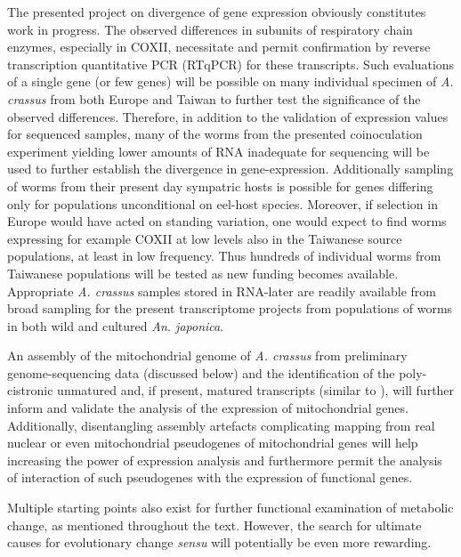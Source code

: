 The presented project on divergence of gene expression obviously
constitutes work in progress. The observed differences in subunits of
respiratory chain enzymes, especially in COXII, necessitate and permit
confirmation by reverse transcription quantitative PCR (RTqPCR) for
these transcripts. Such evaluations of a single gene (or few genes)
will be possible on many individual specimen of \textit{A. crassus}
from both Europe and Taiwan to further test the significance of the
observed differences. Therefore, in addition to the validation of
expression values for sequenced samples, many of the worms from the
presented coinoculation experiment yielding lower amounts of RNA
inadequate for sequencing will be used to further establish the
divergence in gene-expression. Additionally sampling of worms from
their present day sympatric hosts is possible for genes differing only
for populations unconditional on eel-host species. Moreover, if
selection in Europe would have acted on standing variation, one would
expect to find worms expressing for example COXII at low levels also
in the Taiwanese source populations, at least in low frequency. Thus
hundreds of individual worms from Taiwanese populations will be tested
as new funding becomes available. Appropriate \textit{A. crassus}
samples stored in RNA-later are readily available from broad sampling
for the present transcriptome projects from populations of worms in
both wild and cultured \textit{An. japonica}.

An assembly of the mitochondrial genome of \textit{A. crassus} from
preliminary genome-sequencing data (discussed below) and the
identification of the poly-cistronic unmatured and, if present,
matured transcripts (similar to \cite{pmid19843606}), will further
inform and validate the analysis of the expression of mitochondrial
genes. Additionally, disentangling assembly artefacts complicating
mapping from real nuclear or even mitochondrial \cite{pmid20026478}
pseudogenes of mitochondrial genes will help increasing the power of
expression analysis and furthermore permit the analysis of interaction
of such pseudogenes with the expression of functional genes.

Multiple starting points also exist for further functional examination
of metabolic change, as mentioned throughout the text. However, the
search for ultimate causes for evolutionary change \textit{sensu}
\cite{mayr1961cause} will potentially be even more rewarding.

